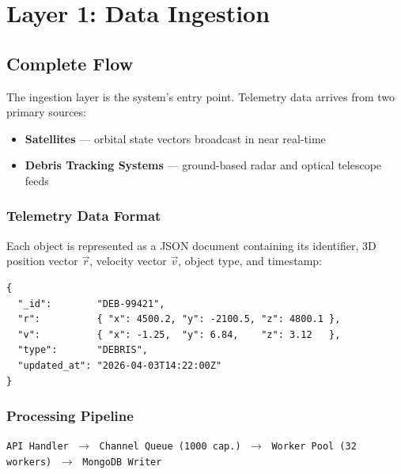 \documentclass[11pt, a4paper]{article}
\begin{document}
\section{Layer 1: Data Ingestion}

\subsection{Complete Flow}

The ingestion layer is the system's entry point. Telemetry data arrives from two primary sources:

\begin{itemize}[leftmargin=1.5cm]
  \item \textbf{Satellites} --- orbital state vectors broadcast in near real-time
  \item \textbf{Debris Tracking Systems} --- ground-based radar and optical telescope feeds
\end{itemize}

\subsubsection{Telemetry Data Format}

Each object is represented as a JSON document containing its identifier, 3D position vector
$\vec{r}$, velocity vector $\vec{v}$, object type, and timestamp:

\begin{lstlisting}[style=jsonstyle, caption={Sample Telemetry Payload (POST /api/telemetry)}]
{
  "_id":        "DEB-99421",
  "r":          { "x": 4500.2, "y": -2100.5, "z": 4800.1 },
  "v":          { "x": -1.25,  "y": 6.84,    "z": 3.12   },
  "type":       "DEBRIS",
  "updated_at": "2026-04-03T14:22:00Z"
}
\end{lstlisting}

\subsubsection{Processing Pipeline}

\begin{center}
\texttt{API Handler} $\;\rightarrow\;$ \texttt{Channel Queue (1000 cap.)} $\;\rightarrow\;$
\texttt{Worker Pool (32 workers)} $\;\rightarrow\;$ \texttt{MongoDB Writer}
\end{center}
\end{document}

